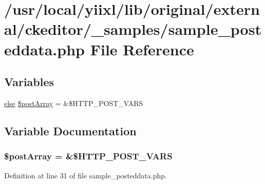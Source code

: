\hypertarget{sample__posteddata_8php}{
\section{/usr/local/yiixl/lib/original/external/ckeditor/\_\-samples/sample\_\-posteddata.php File Reference}
\label{sample__posteddata_8php}
}
\subsection*{Variables}
\begin{DoxyCompactItemize}
\item 
\hyperlink{config_8php_a0544c3fe466e421738dae463968b70ba}{else} \hyperlink{sample__posteddata_8php_a04d233692b44ef6f1d53c081c35b0e86}{\$postArray} = \&\$HTTP\_\-POST\_\-VARS
\end{DoxyCompactItemize}


\subsection{Variable Documentation}
\hypertarget{sample__posteddata_8php_a04d233692b44ef6f1d53c081c35b0e86}{
\subsubsection[{\$postArray}]{ \$postArray = \&\$HTTP\_\-POST\_\-VARS}}
\label{sample__posteddata_8php_a04d233692b44ef6f1d53c081c35b0e86}


Definition at line 31 of file sample\_\-posteddata.php.

